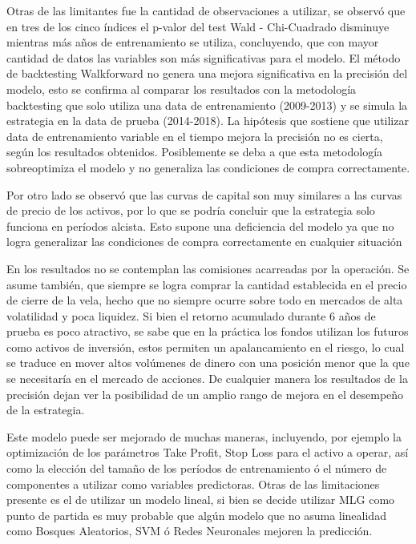\documentclass[a4paper,12pt]{Latex/Classes/PhDthesisPSnPDF}
\begin{document}
Otras de las limitantes fue la cantidad de observaciones a utilizar, se observó que en tres de los cinco índices el p-valor del test Wald - Chi-Cuadrado disminuye mientras más años de entrenamiento se utiliza, concluyendo, que con mayor cantidad de datos las variables son más significativas para el modelo. El método de backtesting Walkforward no genera una mejora significativa en la precisión del modelo, esto se confirma al comparar los resultados con la metodología backtesting que solo utiliza una data de entrenamiento (2009-2013) y se simula la estrategia en la data de prueba (2014-2018). La hipótesis que sostiene que utilizar data de entrenamiento variable en el tiempo mejora la precisión no es cierta, según los resultados obtenidos. Posiblemente se deba a que esta metodología sobreoptimiza el modelo y no generaliza las condiciones de compra correctamente.

Por otro lado se observó que las curvas de capital son muy similares a las curvas de precio de los activos, por lo que se podría concluir que la estrategia solo funciona en períodos alcista. Esto supone una deficiencia del modelo ya que no logra generalizar las condiciones de compra correctamente en cualquier situación

En los resultados no se contemplan las comisiones acarreadas por la operación. Se asume también, que siempre se logra comprar la cantidad establecida en el precio de cierre de la vela, hecho que no siempre ocurre sobre todo en mercados de alta volatilidad y poca liquidez. Si bien el retorno acumulado durante 6 años de prueba es poco atractivo, se sabe que en la práctica los fondos utilizan los futuros como activos de inversión, estos permiten un apalancamiento en el riesgo, lo cual se traduce en mover altos volúmenes de dinero con una posición menor que la que se necesitaría en el mercado de acciones. De cualquier manera los resultados de la precisión dejan ver la posibilidad de un amplio rango de mejora en el desempeño de la estrategia. 

Este modelo puede ser mejorado de muchas maneras, incluyendo, por ejemplo la optimización de los parámetros Take Profit, Stop Loss para el activo a operar, así como la elección del tamaño de los períodos de entrenamiento ó el número de componentes a utilizar como variables predictoras. Otras de las limitaciones presente es el de utilizar un modelo lineal, si bien se decide utilizar MLG como punto de partida es muy probable que algún modelo que no asuma linealidad como Bosques Aleatorios, SVM ó Redes Neuronales mejoren la predicción. 
\end{document}
